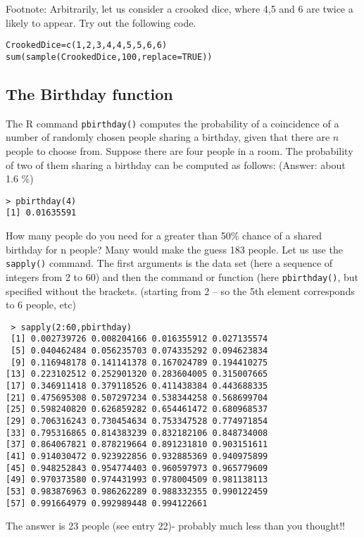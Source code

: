 \documentclass[11pt]{article} %
\begin{document}
Footnote: Arbitrarily, let us consider a crooked dice, where 4,5 and 6 are twice a likely to appear. Try out the following code.
\begin{verbatim}
CrookedDice=c(1,2,3,4,4,5,5,6,6)
sum(sample(CrookedDice,100,replace=TRUE))
\end{verbatim}

\newpage
\subsection{The Birthday function}
The R command \texttt{pbirthday()} computes the probability of a coincidence of a number of randomly chosen people sharing a birthday, given that there are $n$ people to choose from.
Suppose there are four people in a room. The probability of two of them sharing a birthday can be computed as follows: (Answer:  about 1.6 \%)
\begin{verbatim}
> pbirthday(4)
[1] 0.01635591
\end{verbatim}



\noindent How many people do you need for a greater than 50\% chance of a shared birthday for n people? Many would make the guess 183 people.  Let us use the \texttt{sapply()} command. The first arguments is the data set (here a sequence of integers from 2 to 60) and then the command or function (here \texttt{pbirthday()}, but specified without the brackets.
(starting from 2 – so the 5th element corresponds to 6 people, etc)
\begin{verbatim}
 > sapply(2:60,pbirthday)
 [1] 0.002739726 0.008204166 0.016355912 0.027135574
 [5] 0.040462484 0.056235703 0.074335292 0.094623834
 [9] 0.116948178 0.141141378 0.167024789 0.194410275
[13] 0.223102512 0.252901320 0.283604005 0.315007665
[17] 0.346911418 0.379118526 0.411438384 0.443688335
[21] 0.475695308 0.507297234 0.538344258 0.568699704
[25] 0.598240820 0.626859282 0.654461472 0.680968537
[29] 0.706316243 0.730454634 0.753347528 0.774971854
[33] 0.795316865 0.814383239 0.832182106 0.848734008
[37] 0.864067821 0.878219664 0.891231810 0.903151611
[41] 0.914030472 0.923922856 0.932885369 0.940975899
[45] 0.948252843 0.954774403 0.960597973 0.965779609
[49] 0.970373580 0.974431993 0.978004509 0.981138113
[53] 0.983876963 0.986262289 0.988332355 0.990122459
[57] 0.991664979 0.992989448 0.994122661
\end{verbatim}
The answer is 23 people (see entry 22)- probably much less than you thought!!
\end{document}
